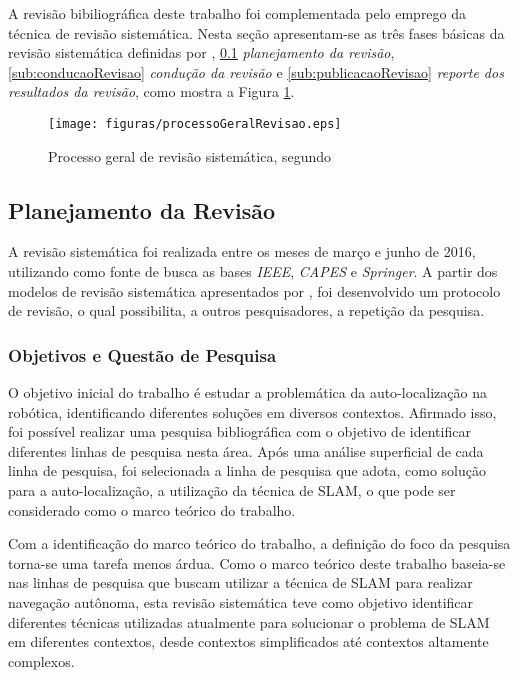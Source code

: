 
	A revisão bibiliográfica deste trabalho foi complementada pelo emprego da técnica de revisão sistemática. Nesta seção apresentam-se as três fases básicas da revisão sistemática definidas por \cite{Kitchenham}, \ref{sub:planejamentoRevisao} \textit{planejamento da revisão}, \ref{sub:conducaoRevisao} \textit{condução da revisão} e \ref{sub:publicacaoRevisao} \textit{reporte dos resultados da revisão}, como mostra a Figura \ref{img:processoGeralRevisao}.

	\begin{figure}[H]
			\centering
			\texttt{[image: figuras/processoGeralRevisao.eps]}
			\caption[Processo Geral de Revisão Sistemática]{Processo geral de revisão sistemática, segundo \cite{Kitchenham}}
			\label{img:processoGeralRevisao}
		\end{figure}

	\subsection{Planejamento da Revisão} %
	\label{sub:planejamentoRevisao}

		A revisão sistemática foi realizada entre os meses de março e junho de 2016, utilizando como fonte de busca as bases \textit{IEEE}, \textit{CAPES} e \textit{Springer}. A partir dos modelos de revisão sistemática apresentados por \cite{Kitchenham}, foi desenvolvido um protocolo de revisão, o qual possibilita, a outros pesquisadores, a repetição da pesquisa.

		\subsubsection{Objetivos e Questão de Pesquisa}

		O objetivo inicial do trabalho é estudar a problemática da auto-localização na robótica, identificando diferentes soluções em diversos contextos. Afirmado isso, foi possível realizar uma pesquisa bibliográfica com o objetivo de identificar diferentes linhas de pesquisa nesta área. Após uma análise superficial de cada linha de pesquisa, foi selecionada a linha de pesquisa que adota, como solução para a auto-localização, a utilização da técnica de SLAM, o que pode ser considerado como o marco teórico do trabalho.

		Com a identificação do marco teórico do trabalho, a definição do foco da pesquisa torna-se uma tarefa menos árdua. Como o marco teórico deste trabalho baseia-se nas linhas de pesquisa que buscam utilizar a técnica de SLAM para realizar navegação autônoma, esta revisão sistemática teve como objetivo identificar diferentes técnicas utilizadas atualmente para solucionar o problema de SLAM em diferentes contextos, desde contextos simplificados até contextos altamente complexos.

